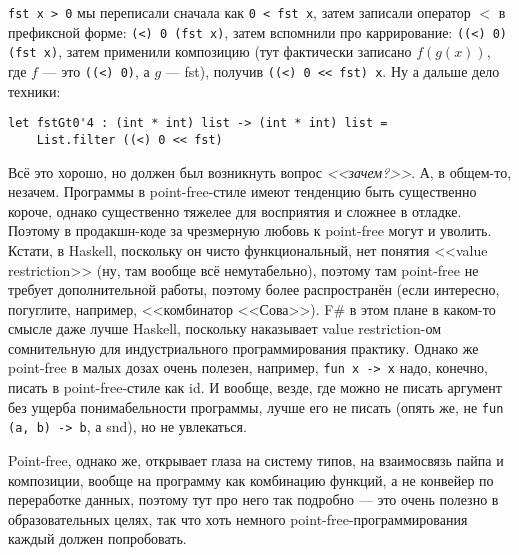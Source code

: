 \documentclass{../../text-style}
\begin{document}
\texttt{fst x > 0} мы переписали сначала как \texttt{0 < fst x}, затем записали оператор $<$ в префиксной форме: \texttt{(<) 0 (fst x)}, затем вспомнили про каррирование: \texttt{((<) 0) (fst x)}, затем применили композицию (тут фактически записано $f(g(x))$, где  $f$ --- это \texttt{((<) 0)}, а $g$ --- fst), получив \texttt{((<) 0 << fst) x}. Ну а дальше дело техники:

\begin{verbatim}
let fstGt0'4 : (int * int) list -> (int * int) list = 
    List.filter ((<) 0 << fst)
\end{verbatim}

Всё это хорошо, но должен был возникнуть вопрос \emph{<<зачем?>>}. А, в общем-то, незачем. Программы в point-free-стиле имеют тенденцию быть существенно короче, однако существенно тяжелее для восприятия и сложнее в отладке. Поэтому в продакшн-коде за чрезмерную любовь к point-free могут и уволить. Кстати, в Haskell, поскольку он чисто функциональный, нет понятия <<value restriction>> (ну, там вообще всё немутабельно), поэтому там point-free не требует дополнительной работы, поэтому более распространён (если интересно, погуглите, например, <<комбинатор <<Сова>>). F\# в этом плане в каком-то смысле даже лучше Haskell, поскольку наказывает value restriction-ом сомнительную для индустриального программирования практику. Однако же point-free в малых дозах очень полезен, например, \texttt{fun x -> x} надо, конечно, писать в point-free-стиле как id. И вообще, везде, где можно не писать аргумент без ущерба понимабельности программы, лучше его не писать (опять же, не \texttt{fun (a, b) -> b}, а snd), но не увлекаться.

Point-free, однако же, открывает глаза на систему типов, на взаимосвязь пайпа и композиции, вообще на программу как комбинацию функций, а не конвейер по переработке данных, поэтому тут про него так подробно --- это очень полезно в образовательных целях, так что хоть немного point-free-программирования каждый должен попробовать.
\end{document}
